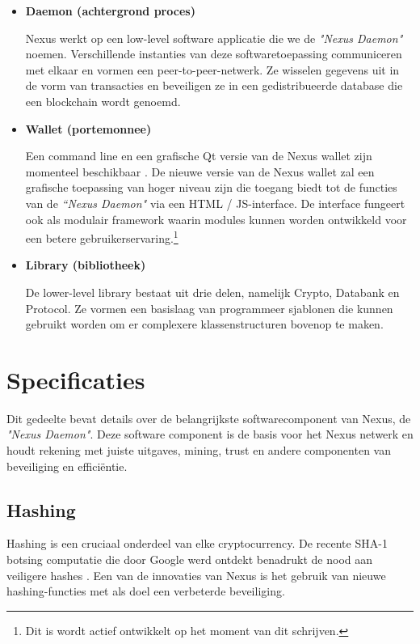 \documentclass[11pt]{article}
\begin{document}
\begin{itemize}
\item \textbf{Daemon (achtergrond proces)}

Nexus werkt op een low-level software applicatie die we de \textit{"Nexus Daemon"} noemen.
Verschillende instanties van deze softwaretoepassing communiceren met elkaar en vormen een peer-to-peer-netwerk. Ze wisselen gegevens uit in de vorm van transacties en beveiligen ze in een gedistribueerde database die een blockchain wordt genoemd.

\item \textbf{Wallet (portemonnee)}

Een command line en een grafische Qt versie van de Nexus wallet zijn momenteel beschikbaar \cite{githubnexusreleases} \cite{nexusearth}.
De nieuwe versie van de Nexus wallet zal een grafische toepassing van hoger niveau zijn die toegang biedt tot de functies van de \textit{``Nexus Daemon"} via een HTML / JS-interface. 
De interface fungeert ook als modulair framework waarin modules kunnen worden ontwikkeld voor een betere gebruikerservaring.\footnote{Dit is wordt actief ontwikkelt op het moment van dit schrijven.}

\item \textbf{Library (bibliotheek)}

De lower-level library bestaat uit drie delen, namelijk Crypto, Databank en Protocol. Ze vormen een basislaag van programmeer sjablonen die kunnen  gebruikt worden om er complexere klassenstructuren bovenop te maken. 

\end{itemize}

\section{Specificaties}

Dit gedeelte bevat details over de belangrijkste softwarecomponent van Nexus, de \textit{"Nexus Daemon"}.
Deze software component is de basis voor het Nexus netwerk en houdt rekening met juiste uitgaves, mining, trust en andere componenten van beveiliging en effici\"entie.
 

\subsection{Hashing}

Hashing is een cruciaal onderdeel van elke cryptocurrency. 
De recente SHA-1 botsing computatie die door Google werd ontdekt benadrukt de nood aan veiligere hashes \cite{googlesha1}. 
Een van de innovaties van Nexus is het gebruik van nieuwe hashing-functies met als doel een verbeterde beveiliging.
\end{document}
